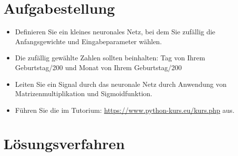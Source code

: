 \section{Aufgabestellung}
\begin{itemize}
    \item Definieren Sie ein kleines neuronales Netz, bei dem Sie zufällig die
          Anfangsgewichte und Eingabeparameter wählen.
    \item Die zufällig gewählte Zahlen sollten beinhalten: Tag von Ihrem
          Geburtstag/200 und Monat von Ihrem Geburtstag/200
    \item Leiten Sie ein Signal durch das neuronale Netz durch Anwendung
          von Matrizenmultiplikation und Sigmoidfunktion.
    \item Führen Sie die im Tutorium: \url{https://www.python-kurs.eu/kurs.php}
          aus.
\end{itemize}

\pagebreak

\section{Lösungsverfahren}